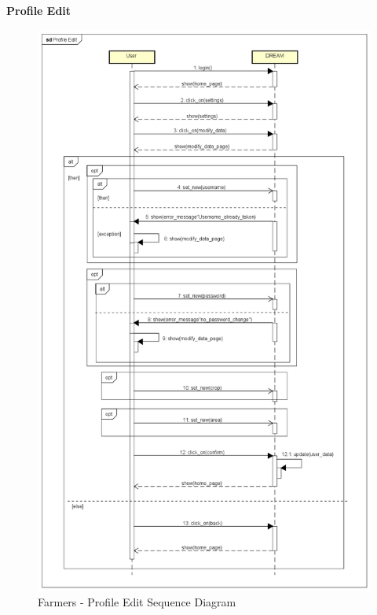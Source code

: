 \documentclass[table, 12pt]{article}
\begin{document}
\begin{itemize}
            \textbf{Profile Edit}\\
            \begin{center}
                \begin{figure}[H]
                    \vspace{-120px}
                    \includegraphics[scale=0.45, center]{assets/Sequence diagrams/Farmer/Profile Edit.png}
                    \caption{Farmers - Profile Edit Sequence Diagram}
                    \label{fig: sequence_editprofile}
                \end{figure}
            \end{center}
            

\end{itemize}
\end{document}
